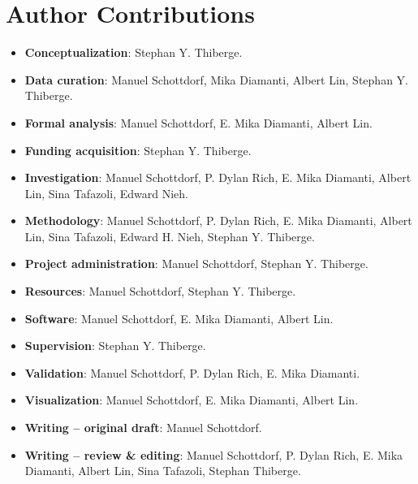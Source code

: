\documentclass[10pt,letterpaper]{article}
\begin{document}
\section*{Author Contributions}
\begin{itemize}
    \item \textbf{Conceptualization}: Stephan Y. Thiberge.
    \item \textbf{Data curation}: Manuel Schottdorf, Mika Diamanti, Albert Lin, Stephan Y. Thiberge.
    \item \textbf{Formal analysis}: Manuel Schottdorf, E. Mika Diamanti, Albert Lin.
    \item \textbf{Funding acquisition}: Stephan Y. Thiberge.
    \item \textbf{Investigation}: Manuel Schottdorf, P. Dylan Rich, E. Mika Diamanti, Albert Lin, Sina Tafazoli, Edward Nieh.
    \item \textbf{Methodology}: Manuel Schottdorf, P. Dylan Rich, E. Mika Diamanti, Albert Lin, Sina Tafazoli, Edward H. Nieh, Stephan Y. Thiberge. 
    \item \textbf{Project administration}: Manuel Schottdorf, Stephan Y. Thiberge.
    \item \textbf{Resources}: Manuel Schottdorf, Stephan Y. Thiberge.
    \item \textbf{Software}: Manuel Schottdorf, E. Mika Diamanti, Albert Lin.
    \item \textbf{Supervision}: Stephan Y. Thiberge.
    \item \textbf{Validation}: Manuel Schottdorf, P. Dylan Rich, E. Mika Diamanti.
    \item \textbf{Visualization}: Manuel Schottdorf, E. Mika Diamanti, Albert Lin.
    \item \textbf{Writing – original draft}: Manuel Schottdorf.
    \item \textbf{Writing – review \& editing}: Manuel Schottdorf, P. Dylan Rich, E. Mika Diamanti, Albert Lin, Sina Tafazoli, Stephan Thiberge.
\end{itemize}

\nolinenumbers
\end{document}
